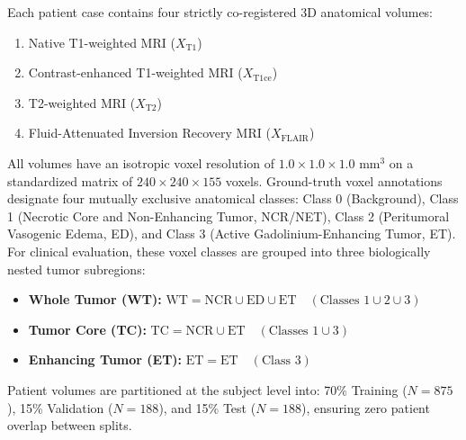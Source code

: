 \documentclass[conference]{IEEEtran}
\begin{document}
Each patient case contains four strictly co-registered 3D anatomical volumes:
\begin{enumerate}
    \item Native T1-weighted MRI ($X_{\text{T1}}$)
    \item Contrast-enhanced T1-weighted MRI ($X_{\text{T1ce}}$)
    \item T2-weighted MRI ($X_{\text{T2}}$)
    \item Fluid-Attenuated Inversion Recovery MRI ($X_{\text{FLAIR}}$)
\end{enumerate}

All volumes have an isotropic voxel resolution of $1.0 \times 1.0 \times 1.0\text{ mm}^3$ on a standardized matrix of $240 \times 240 \times 155$ voxels. Ground-truth voxel annotations designate four mutually exclusive anatomical classes: Class 0 (Background), Class 1 (Necrotic Core and Non-Enhancing Tumor, NCR/NET), Class 2 (Peritumoral Vasogenic Edema, ED), and Class 3 (Active Gadolinium-Enhancing Tumor, ET). For clinical evaluation, these voxel classes are grouped into three biologically nested tumor subregions:
\begin{itemize}
    \item \textbf{Whole Tumor (WT):} $\text{WT} = \text{NCR} \cup \text{ED} \cup \text{ET} \quad (\text{Classes } 1 \cup 2 \cup 3)$
    \item \textbf{Tumor Core (TC):} $\text{TC} = \text{NCR} \cup \text{ET} \quad (\text{Classes } 1 \cup 3)$
    \item \textbf{Enhancing Tumor (ET):} $\text{ET} = \text{ET} \quad (\text{Class } 3)$
\end{itemize}

Patient volumes are partitioned at the subject level into: 70\% Training ($N = 875$), 15\% Validation ($N = 188$), and 15\% Test ($N = 188$), ensuring zero patient overlap between splits.
\end{document}
